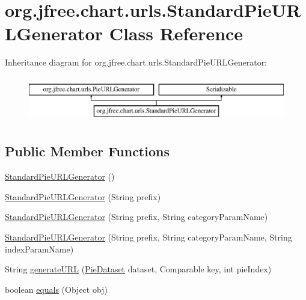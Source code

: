 \hypertarget{classorg_1_1jfree_1_1chart_1_1urls_1_1_standard_pie_u_r_l_generator}{}\section{org.\+jfree.\+chart.\+urls.\+Standard\+Pie\+U\+R\+L\+Generator Class Reference}
\label{classorg_1_1jfree_1_1chart_1_1urls_1_1_standard_pie_u_r_l_generator}
Inheritance diagram for org.\+jfree.\+chart.\+urls.\+Standard\+Pie\+U\+R\+L\+Generator\+:\begin{figure}[H]
\begin{center}
\leavevmode
\includegraphics[height=2.000000cm]{classorg_1_1jfree_1_1chart_1_1urls_1_1_standard_pie_u_r_l_generator}
\end{center}
\end{figure}
\subsection*{Public Member Functions}
\begin{DoxyCompactItemize}
\item 
\mbox{\hyperlink{classorg_1_1jfree_1_1chart_1_1urls_1_1_standard_pie_u_r_l_generator_a3867844f294911b835ed30cc3fadfb3f}{Standard\+Pie\+U\+R\+L\+Generator}} ()
\item 
\mbox{\hyperlink{classorg_1_1jfree_1_1chart_1_1urls_1_1_standard_pie_u_r_l_generator_ae43267d848b1f8d84c59d946cacb0841}{Standard\+Pie\+U\+R\+L\+Generator}} (String prefix)
\item 
\mbox{\hyperlink{classorg_1_1jfree_1_1chart_1_1urls_1_1_standard_pie_u_r_l_generator_aa9951b58d408f876c53c36f028ba93a6}{Standard\+Pie\+U\+R\+L\+Generator}} (String prefix, String category\+Param\+Name)
\item 
\mbox{\hyperlink{classorg_1_1jfree_1_1chart_1_1urls_1_1_standard_pie_u_r_l_generator_a7cc1c5a124c20b44e8842b8baea9d38b}{Standard\+Pie\+U\+R\+L\+Generator}} (String prefix, String category\+Param\+Name, String index\+Param\+Name)
\item 
String \mbox{\hyperlink{classorg_1_1jfree_1_1chart_1_1urls_1_1_standard_pie_u_r_l_generator_ae06548575fdfbd0eb71a8f7ddc531087}{generate\+U\+RL}} (\mbox{\hyperlink{interfaceorg_1_1jfree_1_1data_1_1general_1_1_pie_dataset}{Pie\+Dataset}} dataset, Comparable key, int pie\+Index)
\item 
boolean \mbox{\hyperlink{classorg_1_1jfree_1_1chart_1_1urls_1_1_standard_pie_u_r_l_generator_a22f1f1c7892ec14ae317d8ceb4676bc2}{equals}} (Object obj)
\end{DoxyCompactItemize}


